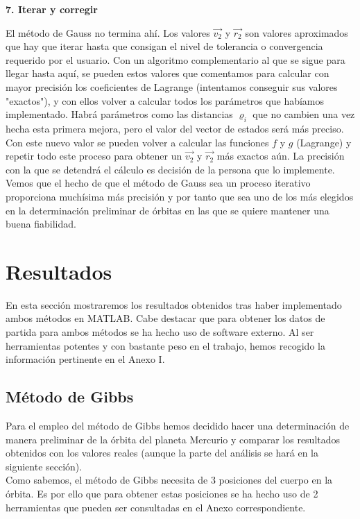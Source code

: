 \documentclass{article}
\numberwithin{equation}{section}
\begin{document}
\noindent\textbf{7. Iterar y corregir}

El método de Gauss no termina ahí. Los valores $\overrightarrow{v_2}$ y $\overrightarrow{r_2}$ son valores aproximados que hay que iterar hasta que consigan el nivel de tolerancia o convergencia requerido por el usuario. Con un algoritmo complementario al que se sigue para llegar hasta aquí, se pueden estos valores que comentamos para calcular con mayor precisión los coeficientes de Lagrange (intentamos conseguir sus valores "exactos"), y con ellos volver a calcular todos los parámetros que habíamos implementado. Habrá parámetros como las distancias $\varrho_i$ que no cambien una vez hecha esta primera mejora, pero el valor del vector de estados será más preciso. Con este nuevo valor se pueden volver a calcular las funciones $f$ y $g$ (Lagrange) y repetir todo este proceso para obtener un $\overrightarrow{v_2}$ y $\overrightarrow{r_2}$ más exactos aún. La precisión con la que se detendrá el cálculo es decisión de la persona que lo implemente.\\

Vemos que el hecho de que el método de Gauss sea un proceso iterativo proporciona muchísima más precisión y por tanto que sea uno de los más elegidos en la determinación preliminar de órbitas en las que se quiere mantener una buena fiabilidad.
\section{Resultados} 
En esta sección mostraremos los resultados obtenidos tras haber 
implementado ambos métodos en MATLAB. Cabe destacar que para obtener los datos de partida para ambos métodos se ha hecho uso de software externo. Al ser herramientas potentes y con bastante peso en el trabajo, hemos recogido la información pertinente en el Anexo I.\\

\subsection{Método de Gibbs}
Para el empleo del método de Gibbs hemos decidido hacer 
una determinación de manera preliminar de la órbita del 
planeta Mercurio y comparar los resultados obtenidos con los 
valores reales (aunque la parte del análisis se hará en 
la siguiente sección). \\

Como sabemos, el método de Gibbs necesita de 3 posiciones 
del cuerpo en la órbita. Es por ello que para obtener estas 
posiciones se ha hecho uso de 2 herramientas que pueden ser consultadas en el Anexo correspondiente. \\
\end{document}
